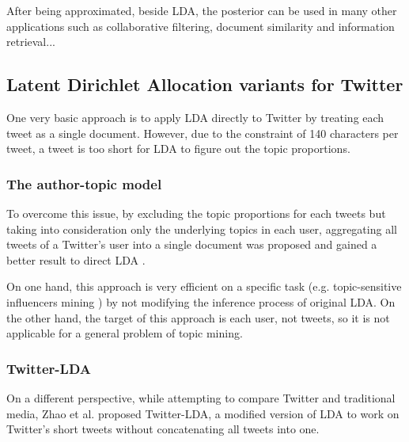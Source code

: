 \documentclass[11pt]{article}
\begin{document}
After being approximated, beside LDA, the posterior can be used in many other applications such as collaborative filtering, document similarity and information retrieval...

\subsection{Latent Dirichlet Allocation variants for Twitter} \label{lda_app}

One very basic approach is to apply LDA directly to Twitter by treating each tweet as a single document. However, due to the constraint of 140 characters per tweet, a tweet is too short for LDA to figure out the topic proportions.

\subsubsection{The author-topic model} \label{author_topic}

To overcome this issue, by excluding the topic proportions for each tweets but taking into consideration only the underlying topics in each user, aggregating all tweets of a Twitter's user into a single document was proposed and gained a better result to direct LDA \cite{Weng2010,hong2010empirical}.

On one hand, this approach is very efficient on a specific task (e.g. topic-sensitive influencers mining \cite{Weng2010}) by not modifying the inference process of original LDA. On the other hand, the target of this approach is each user, not tweets, so it is not applicable for a general problem of topic mining.

\subsubsection{Twitter-LDA} \label{twitter_lda}

On a different perspective, while attempting to compare Twitter and traditional media, Zhao et al. \cite{zhao2011comparing} proposed Twitter-LDA, a modified version of LDA to work on Twitter's short tweets without concatenating all tweets into one.
\end{document}
